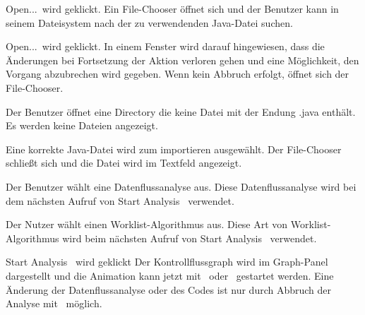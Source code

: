 

{\glqq Open...\grqq\ wird geklickt.}
{Ein File-Chooser öffnet sich und der Benutzer kann in seinem Dateisystem nach der zu verwendenden Java-Datei suchen.}

{\glqq Open...\grqq\ wird geklickt.}
{In einem Fenster wird darauf hingewiesen, dass die Änderungen bei Fortsetzung der Aktion verloren gehen und eine Möglichkeit, den Vorgang abzubrechen wird gegeben. Wenn kein Abbruch erfolgt, öffnet sich der File-Chooser.}

{Der Benutzer öffnet eine Directory die keine Datei mit der Endung .java enthält.}
{Es werden keine Dateien angezeigt.}

{Eine korrekte Java-Datei wird zum importieren ausgewählt.}
{Der File-Chooser schließt sich und die Datei wird im Textfeld angezeigt.}



{Der Benutzer wählt eine Datenflussanalyse aus.}
{Diese Datenflussanalyse wird bei dem nächsten Aufruf von \glqq Start Analysis \grqq\ verwendet.}

{Der Nutzer wählt einen Worklist-Algorithmus aus.}
{Diese Art von Worklist-Algorithmus wird beim nächsten Aufruf von \glqq Start Analysis \grqq\ verwendet.}



{\glqq Start Analysis \grqq\ wird geklickt}
{Der Kontrollflussgraph wird im Graph-Panel dargestellt und die Animation kann jetzt mit \faStepForward\ oder \faPlay\ gestartet werden. Eine Änderung der Datenflussanalyse oder des Codes ist nur durch Abbruch der Analyse mit \faStop\  möglich.}

